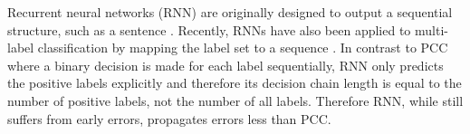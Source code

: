 Recurrent neural networks (RNN) are originally designed to output a sequential structure, such as a sentence \cite{DBLP:conf/emnlp/ChoMGBBSB14}.  Recently, RNNs have also been applied to multi-label classification by mapping the label set to a sequence \cite{DBLP:conf/cvpr/WangYMHHX16,DBLP:journals/corr/ZhangWSZL16,DBLP:conf/icpr/JinN16,DBLP:conf/iccv/WangCLXL17,DBLP:journals/corr/abs-1709-08553,DBLP:conf/aaai/ChenCYW18,DBLP:journals/corr/abs-1806-04822}. In contrast to PCC where a binary decision is made for each label sequentially,  RNN only predicts the positive labels explicitly and therefore its decision chain length is equal to the number of positive labels, not the number of all labels.  Therefore RNN, while still suffers from early errors, propagates errors less than PCC. 










